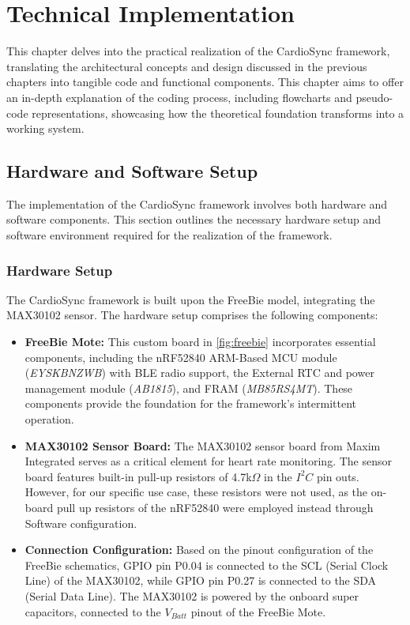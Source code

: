 \chapter{Technical Implementation}
This chapter delves into the practical realization of the CardioSync framework, translating the architectural concepts and design discussed in the previous chapters into tangible code and functional components. This chapter aims to offer an in-depth explanation of the coding process, including flowcharts and pseudo-code representations, showcasing how the theoretical foundation transforms into a working system.

\section{Hardware and Software Setup}
The implementation of the CardioSync framework involves both hardware and software components. This section outlines the necessary hardware setup and software environment required for the realization of the framework.

\subsection{Hardware Setup}
The CardioSync framework is built upon the FreeBie model, integrating the MAX30102 sensor. The hardware setup comprises the following components:

\begin{itemize}
    \item \textbf{FreeBie Mote:} This custom board in \autoref{fig:freebie} incorporates essential components, including the nRF52840 ARM-Based MCU module (\textit{EYSKBNZWB}) with BLE radio support, the External RTC and power management module (\textit{AB1815}), and FRAM (\textit{MB85RS4MT}). These components provide the foundation for the framework's intermittent operation.
    
    \item \textbf{MAX30102 Sensor Board:} The MAX30102 sensor board from Maxim Integrated serves as a critical element for heart rate monitoring. The sensor board features built-in pull-up resistors of 4.7k\(\Omega\) in the \(I^2C\) pin outs. However, for our specific use case, these resistors were not used, as the on-board pull up resistors of the nRF52840 were employed instead through Software configuration.
    
    \item \textbf{Connection Configuration:} Based on the pinout configuration of the FreeBie schematics, GPIO pin P0.04 is connected to the SCL (Serial Clock Line) of the MAX30102, while GPIO pin P0.27 is connected to the SDA (Serial Data Line). The MAX30102 is powered by the onboard super capacitors, connected to the \(V_{Batt}\) pinout of the FreeBie Mote.
\end{itemize}


